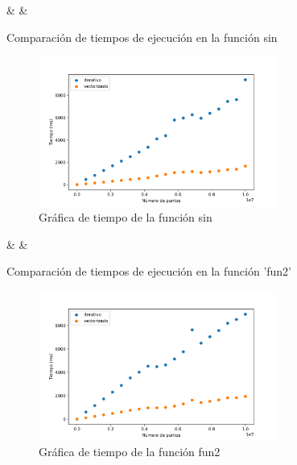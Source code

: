 \documentclass[6pt]{../../shared/AiTex}
\begin{document}
\begin{table}[H]
    \centering
    {\casos & \iterativo & \vectorizado}
    \caption{Comparación de tiempos de ejecución en la función sin}
    \label{table:sin}
\end{table}

\begin{figure}[H]
    \centering
    \includegraphics[width=0.7\textwidth]{./imagenes/tiempos_sin.png}
    \caption{Gráfica de tiempo de la función sin}
    \label{fig:tiempos_sin}
\end{figure}

\begin{table}[H]
    \centering
    {\casos & \iterativo & \vectorizado}
    \caption{Comparación de tiempos de ejecución en la función 'fun2'}
    \label{table:fun2}
\end{table}

\begin{figure}[H]
    \centering
    \includegraphics[width=0.7\textwidth]{./imagenes/tiempos_fun2.png}
    \caption{Gráfica de tiempo de la función fun2}
    \label{fig:tiempos_fun2}
\end{figure}
\end{document}
